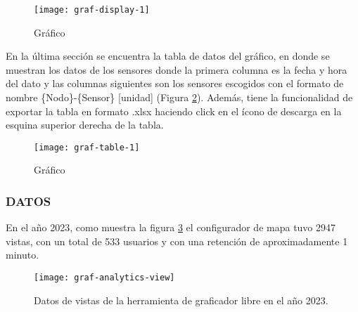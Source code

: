 \begin{figure}[H]
	\centering
	\texttt{[image: graf-display-1]}
	\caption{\label{fig:graf-display-1} Gráfico}
\end{figure}

En la última sección se encuentra la tabla de datos del gráfico, en donde se muestran los datos de los sensores donde la primera columna es la fecha y hora del dato y las columnas siguientes son los sensores escogidos con el formato de nombre \{Nodo\}-\{Sensor\} [unidad] (Figura \ref{fig:graf-table-1}). 
Además, tiene la funcionalidad de exportar la tabla en formato .xlsx haciendo click en el ícono de descarga en la esquina superior derecha de la tabla.

\begin{figure}[H]
	\centering
	\texttt{[image: graf-table-1]}
	\caption{\label{fig:graf-table-1} Gráfico}
\end{figure}


\subsubsection{DATOS}

En el año 2023, como muestra la figura \ref{fig:graf-analytics-view} el configurador de mapa tuvo 2947 vistas, con un total de 533 usuarios y con una retención de aproximadamente 1 minuto.
\begin{figure}[H]
	\centering
	\texttt{[image: graf-analytics-view]}
	\caption{\label{fig:graf-analytics-view} Datos de vistas de la herramienta de graficador libre en el año 2023.}
\end{figure}
